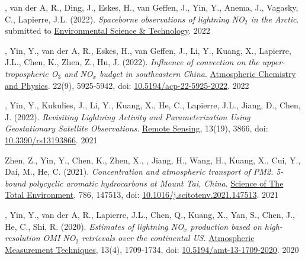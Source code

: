 

\begin{cvpublications}

\publication
{, van der A, R., Ding, J., Eskes, H., van Geffen, J.,
Yin, Y., Anema, J., Vagasky, C., Lapierre, J.L. (2022).
\emph{Spaceborne observations of lightning NO$_2$ in the Arctic}.
submitted to \underline{Environmental Science \& Technology}.} %
{2022} %

\publication
{, Yin, Y., van der A, R., Eskes, H., van Geffen, J.,
Li, Y., Kuang, X., Lapierre, J.L., Chen, K., Zhen, Z., Hu, J. (2022).
\emph{Influence of convection on the upper-tropospheric O$_3$ and NO$_x$ budget in southeastern China}.
\underline{Atmospheric Chemistry and Physics}.
22(9), 5925-5942, doi: \href{https://doi.org/10.5194/acp-22-5925-2022}{10.5194/acp-22-5925-2022}.} %
{2022} %

\publication
{, Yin, Y., Kukulies, J., Li, Y., Kuang, X.,
He, C., Lapierre, J.L., Jiang, D., Chen, J. (2022).
\emph{Revisiting Lightning Activity and Parameterization Using
Geostationary Satellite Observations}.
\underline{Remote Sensing}, 13(19), 3866,
doi: \href{https://doi.org/10.3390/rs13193866}{10.3390/rs13193866}.} %
{2021} %

\publication
{Zhen, Z., Yin, Y., Chen, K., Zhen, X., ,
Jiang, H., Wang, H., Kuang, X., Cui, Y., Dai, M., He, C. (2021).
\emph{Concentration and atmospheric transport of PM2. 5-bound polycyclic aromatic hydrocarbons at Mount Tai, China}.
\underline{Science of The Total Environment}, 786, 147513,
doi: \href{https://doi.org/10.1016/j.scitotenv.2021.147513}{10.1016/j.scitotenv.2021.147513}.} %
{2021} %

\publication
{, Yin, Y., van der A, R., Lapierre, J.L.,
Chen, Q., Kuang, X., Yan, S., Chen, J., He, C., Shi, R. (2020).
\emph{Estimates of lightning NO$_x$ production based on high-resolution OMI NO$_2$ retrievals over the continental US}.
\underline{Atmospheric Measurement Techniques}, 13(4), 1709-1734,
doi: \href{https://doi.org/10.5194/amt-13-1709-2020}{10.5194/amt-13-1709-2020}.} %
{2020} %


\end{cvpublications}
